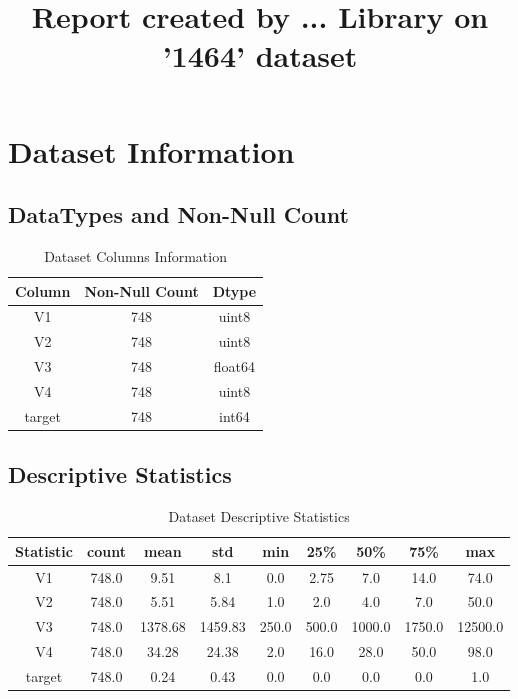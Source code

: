 \documentclass{article}%
\title{Report created by ... Library on '1464' dataset}%
\begin{document}
%
\normalsize%
\maketitle%
\section{Dataset Information}%
\label{sec:DatasetInformation}%
\subsection{DataTypes and Non{-}Null Count}%
\label{subsec:DataTypesandNon{-}NullCount}%


\begin{table}[h!]%
\caption{Dataset Columns Information}%
\vspace{0.2cm}%
\centering%
\begin{tabular}{|c|c|c|}%
\hline%
Column&Non{-}Null Count&Dtype\\%
\hline%
V1&748&uint8\\%
V2&748&uint8\\%
V3&748&float64\\%
V4&748&uint8\\%
target&748&int64\\%
\hline%
\end{tabular}%
\end{table}

%
\subsection{Descriptive Statistics}%
\label{subsec:DescriptiveStatistics}%


\begin{table}[h!]%
\caption{Dataset Descriptive Statistics}%
\vspace{0.2cm}%
\centering%
\begin{tabular}{|c|c|c|c|c|c|c|c|c|}%
\hline%
Statistic&count&mean&std&min&25\%&50\%&75\%&max\\%
\hline%
V1&748.0&9.51&8.1&0.0&2.75&7.0&14.0&74.0\\%
V2&748.0&5.51&5.84&1.0&2.0&4.0&7.0&50.0\\%
V3&748.0&1378.68&1459.83&250.0&500.0&1000.0&1750.0&12500.0\\%
V4&748.0&34.28&24.38&2.0&16.0&28.0&50.0&98.0\\%
target&748.0&0.24&0.43&0.0&0.0&0.0&0.0&1.0\\%
\hline%
\end{tabular}%
\end{table}
\end{document}
